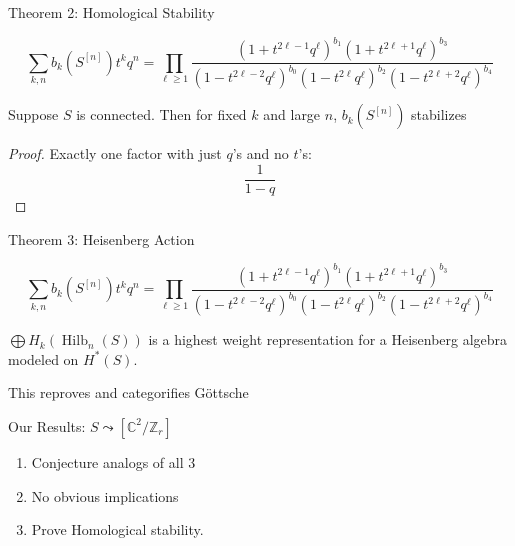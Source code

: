 \documentclass{beamer}
\DeclareMathOperator{\Hilb}{Hilb}
\newcommand{\C}{\mathbb{C}}
\newcommand{\Z}{\mathbb{Z}}
\begin{document}
\begin{frame}{Theorem 2: Homological Stability}
  \begin{Theorem}[G\"ottsche, 1990]
$$\sum_{k,n} b_k(S^{[n]})t^k q^n=\prod_{\ell\geq 1} \frac{(1+t^{2\ell-1}q^\ell)^{b_1}(1+t^{2\ell+1}q^\ell)^{b_3}}{(1-t^{2\ell-2}q^\ell)^{b_0}(1-t^{2\ell}q^\ell)^{b_2}(1-t^{2\ell+2}q^\ell)^{b_4}}$$
\end{Theorem}
\begin{corollary}  Suppose $S$ is connected.
Then for fixed $k$ and large $n$, $b_{k}(S^{[n]})$ stabilizes
\end{corollary}

\begin{proof}
Exactly one factor with just $q$'s and no $t$'s:
$$\frac{1}{1-q}$$ 

\end{proof}


\end{frame}


\begin{frame}{Theorem 3: Heisenberg Action}
  \begin{Theorem}[G\"ottsche, 1990]
$$\sum_{k,n} b_k(S^{[n]})t^k q^n=\prod_{\ell\geq 1} \frac{(1+t^{2\ell-1}q^\ell)^{b_1}(1+t^{2\ell+1}q^\ell)^{b_3}}{(1-t^{2\ell-2}q^\ell)^{b_0}(1-t^{2\ell}q^\ell)^{b_2}(1-t^{2\ell+2}q^\ell)^{b_4}}$$
\end{Theorem}
\begin{Theorem}
$\bigoplus H_k(\Hilb_n(S))$ is a highest weight representation for a Heisenberg algebra modeled on $H^*(S)$.
\end{Theorem}
This reproves and categorifies G\"ottsche
\end{frame}

\begin{frame}[plain, c]
\Huge
\begin{center}{
Our Results: $S\leadsto [\C^2/\Z_r]$}
\end{center}
\begin{enumerate}
\item  Conjecture analogs of all 3
\item No obvious implications 
\item  Prove Homological stability.
\end{enumerate}

\end{frame}
\end{document}
